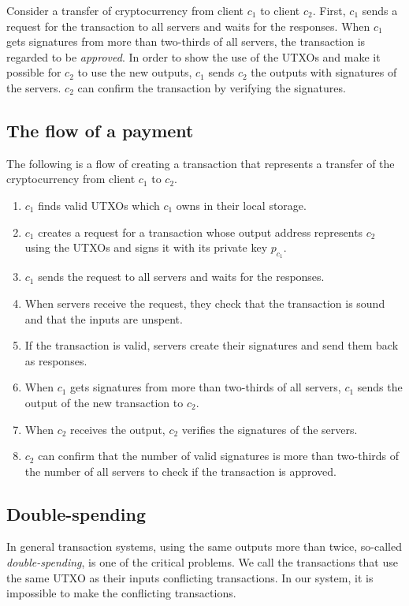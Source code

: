\documentclass[a4paper, oneside]{discothesis}
\begin{document}
Consider a transfer of cryptocurrency from client $c_1$ to client $c_2$.
First, $c_1$ sends a request for the transaction to all servers and waits for the responses.
When $c_1$ gets signatures from more than two-thirds of all servers,
the transaction is regarded to be \emph{approved}.
In order to show the use of the UTXOs and make it possible for $c_2$ to use the new outputs,
$c_1$ sends $c_2$ the outputs with signatures of the servers.
$c_2$ can confirm the transaction by verifying the signatures.

\subsection{The flow of a payment}
The following is a flow of creating a transaction
that represents a transfer of the cryptocurrency from client $c_1$ to $c_2$.

\begin{enumerate}
    \item $c_1$ finds valid UTXOs which $c_1$ owns in their local storage.
    \item $c_1$ creates a request for a transaction whose output address represents $c_2$ using the UTXOs and signs it with its private key $p_{c_1}$.
    \item $c_1$ sends the request to all servers and waits for the responses.
    \item When servers receive the request, they check that the transaction is sound
        and that the inputs are unspent.
    \item If the transaction is valid,
        servers create their signatures and send them back as responses.
    \item When $c_1$ gets signatures from more than two-thirds of all servers,
        $c_1$ sends the output of the new transaction to $c_2$.
    \item When $c_2$ receives the output, $c_2$ verifies the signatures of the servers.
    \item $c_2$ can confirm that the number of valid signatures is more than two-thirds
        of the number of all servers to check if the transaction is approved.
\end{enumerate}


\subsection{Double-spending}
\label{sub:double-spending}
In general transaction systems, using the same outputs more than twice,
so-called \emph{double-spending}, is one of the critical problems.
We call the transactions that use the same UTXO as their inputs conflicting transactions.
In our system, it is impossible to make the conflicting transactions.
\end{document}
